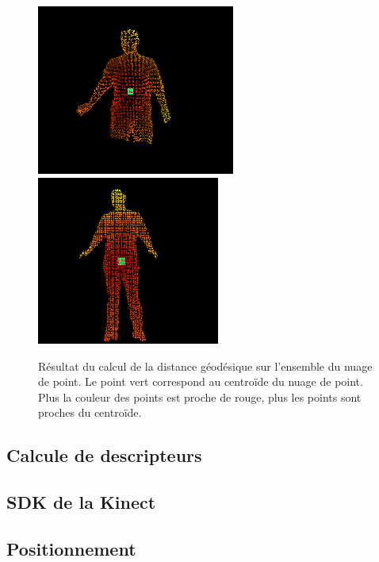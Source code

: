 \begin{figure}[!ht]
  \begin{center}
    \includegraphics[width=6.5cm]{image/geodesic1.PNG}
    \includegraphics[width=6cm]{image/geodesic2.PNG}
    \caption{Résultat du calcul de la distance géodésique sur l'ensemble du nuage de point. Le point vert correspond au centroïde du
    nuage de point. Plus la couleur des points est proche de rouge, plus les points sont proches du centroïde.}
    \label{fig:cheminGeodesique}
  \end{center}
\end{figure}

 
\subsection{Calcule de descripteurs}
\subsection{SDK de la Kinect}
\subsection{Positionnement}
